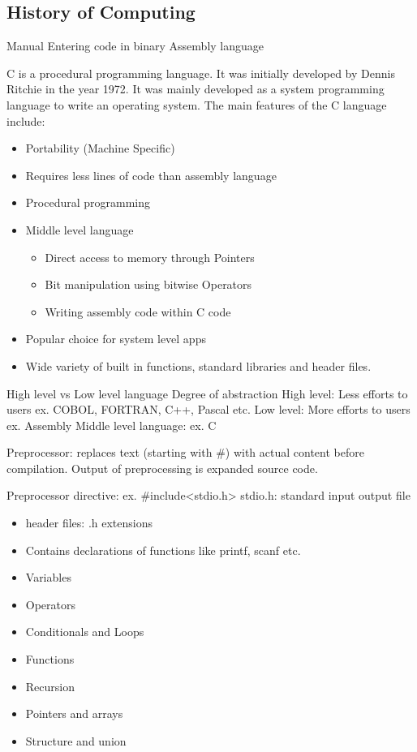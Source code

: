 \subsection{History of Computing}

Manual Entering code in binary 
Assembly language 

C is a procedural programming language. It was initially developed by Dennis Ritchie in the year 1972. It was mainly developed as a system programming language to write an operating system. The main features of the C language include: 
\begin{itemize}
    \item Portability (Machine Specific)
    \item Requires less lines of code than assembly language
    \item Procedural programming
    \item Middle level language   
    \begin{itemize}
        \item Direct access to memory through Pointers
        \item Bit manipulation using bitwise Operators
        \item Writing assembly code within C code
    \end{itemize}
    \item Popular choice for system level apps
    \item Wide variety of built in functions, standard libraries and header files.
\end{itemize}

High level vs Low level language
Degree of abstraction 
High level: Less efforts to users ex. COBOL, FORTRAN, C++, Pascal etc.
Low level: More efforts to users ex. Assembly
Middle level language: ex. C 

Preprocessor: replaces text (starting with \#) with actual content before compilation. Output of preprocessing is expanded source code.

Preprocessor directive: ex. \#include<stdio.h>
stdio.h: standard input output file 
\begin{itemize}
    \item header files: .h extensions  
    \item Contains declarations of functions like printf, scanf etc.
\end{itemize}

\begin{itemize}
    \item Variables
    \item Operators
    \item Conditionals and Loops
    \item Functions
    \item Recursion
    \item Pointers and arrays
    \item Structure and union
\end{itemize}